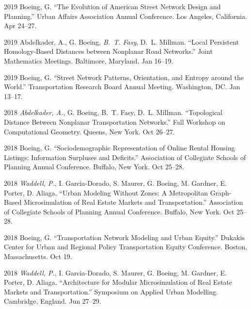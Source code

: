 \documentclass[12pt,letterpaper]{report}
\begin{document}
	\begin{tablist}
		
		\item[2019] \tab Boeing, G. \enquote{The Evolution of American Street Network Design and Planning.} Urban Affairs Association Annual Conference. Los Angeles, California. Apr 24--27.
		
		\item[2019] \tab Abdelkader, A., G. Boeing, \textit{B.~T. Fasy}, D.~L. Millman. \enquote{Local Persistent Homology-Based Distances between Nonplanar Road Networks.} Joint Mathematics Meetings. Baltimore, Maryland. Jan 16--19.
		
		\item[2019] \tab Boeing, G. \enquote{Street Network Patterns, Orientation, and Entropy around the World.} Transportation Research Board Annual Meeting. Washington, DC. Jan 13--17.
		
		\item[2018] \tab \textit{Abdelkader, A.}, G. Boeing, B.~T. Fasy, D.~L. Millman. \enquote{Topological Distance Between Nonplanar Transportation Networks.} Fall Workshop on Computational Geometry. Queens, New York. Oct 26--27.
		
		\item[2018] \tab Boeing, G. \enquote{Sociodemographic Representation of Online Rental Housing Listings: Information Surpluses and Deficits.} Association of Collegiate Schools of Planning Annual Conference. Buffalo, New York. Oct 25--28.
		
		\item[2018] \tab \textit{Waddell, P.}, I. Garcia-Dorado, S. Maurer, G. Boeing, M. Gardner, E. Porter, D. Aliaga. \enquote{Urban Modeling Without Zones: A Metropolitan Graph-Based Microsimulation of Real Estate Markets and Transportation.} Association of Collegiate Schools of Planning Annual Conference. Buffalo, New York. Oct 25--28.
		
		\item[2018] \tab Boeing, G. \enquote{Transportation Network Modeling and Urban Equity.} Dukakis Center for Urban and Regional Policy Transportation Equity Conference. Boston, Massachusetts. Oct 19.
		
		\item[2018] \tab \textit{Waddell, P.}, I. Garcia-Dorado, S. Maurer, G. Boeing, M. Gardner, E. Porter, D. Aliaga. \enquote{Architecture for Modular Microsimulation of Real Estate Markets and Transportation.} Symposium on Applied Urban Modelling. Cambridge, England. Jun 27--29.
		

\end{tablist}
\end{document}
